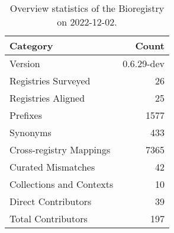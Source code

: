 \begin{table}
\centering
\caption{Overview statistics of the Bioregistry on 2022-12-02.}
\label{tab:bioregistry-summary}
\begin{tabular}{lr}
\toprule
                Category &      Count \\
\midrule
                 Version & 0.6.29-dev \\
     Registries Surveyed &         26 \\
      Registries Aligned &         25 \\
                Prefixes &       1577 \\
                Synonyms &        433 \\
 Cross-registry Mappings &       7365 \\
      Curated Mismatches &         42 \\
Collections and Contexts &         10 \\
     Direct Contributors &         39 \\
      Total Contributors &        197 \\
\bottomrule
\end{tabular}
\end{table}
